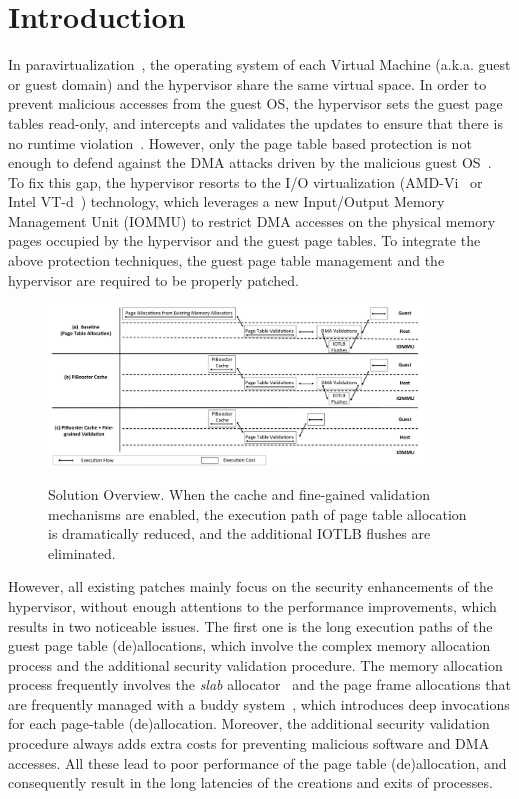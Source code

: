 \section{Introduction} \label{sec:intro}
In paravirtualization~\cite{XEN-SOSP03,whitaker2002scale}, the operating system of each Virtual Machine (a.k.a. guest or guest domain) and the hypervisor share the same virtual space.
In order to prevent malicious accesses from the guest OS, the hypervisor sets the guest page tables read-only, and intercepts and validates the updates to ensure that there is no runtime violation~\cite{XEN-SOSP03}.
However, only the page table based protection is not enough to defend against the DMA attacks driven by the malicious guest OS~\cite{disaggregation}.
To fix this gap, the hypervisor resorts to the I/O virtualization (AMD-Vi~\cite{amdvt} or Intel VT-d~\cite{intelvt}) technology, which leverages a new Input/Output Memory Management Unit (IOMMU) to restrict DMA accesses on the physical memory pages occupied by the hypervisor and the guest page tables.
To integrate the above protection techniques, the guest page table management and the hypervisor are required to be properly patched.

\begin{figure}[ht]
\centering
\includegraphics[width=0.9\textwidth]{image/overview/overview.pdf} \\
\caption{Solution Overview. When the \name cache and fine-gained validation mechanisms are enabled,
the execution path of page table allocation is dramatically reduced, and the additional IOTLB flushes are eliminated.}
\label{fig:overview}
\end{figure}

However, all existing patches mainly focus on the security enhancements of the hypervisor, without enough attentions to the performance improvements, which results in two noticeable issues.
The first one is the long execution paths of the guest page table (de)allocations, which involve the complex memory allocation process and the additional security validation procedure.
The memory allocation process frequently involves the \emph{slab} allocator~\cite{slaballocator} and the page frame allocations that are frequently managed with a buddy system~\cite{buddyallocator}, which introduces deep invocations for each page-table (de)allocation.
Moreover, the additional security validation procedure always adds extra costs for preventing malicious software and DMA accesses.
All these lead to poor performance of the page table (de)allocation, and consequently result in the long latencies of the creations and exits of processes.

